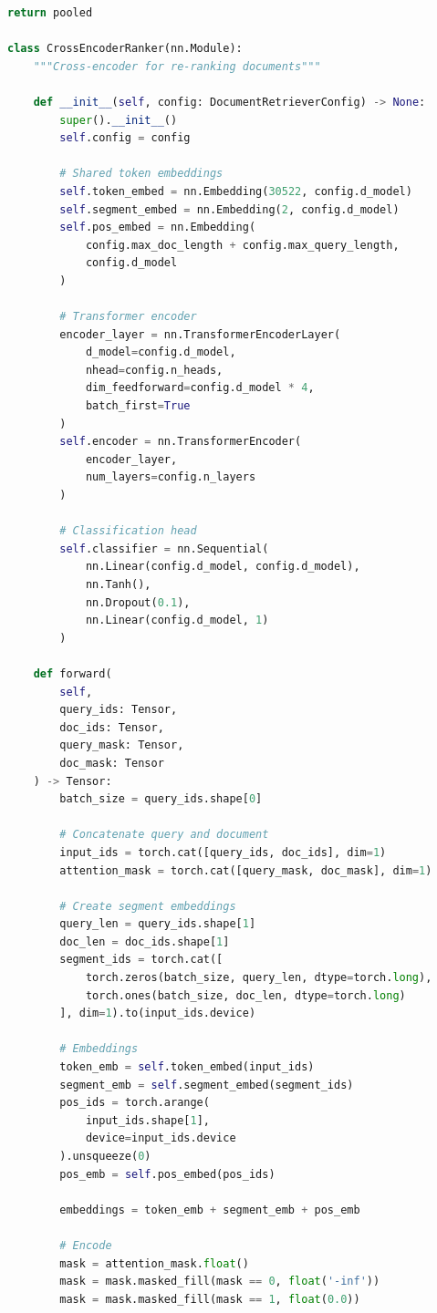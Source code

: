 \begin{lstlisting}[language=Python, caption=Document Retrieval System]
        return pooled

class CrossEncoderRanker(nn.Module):
    """Cross-encoder for re-ranking documents"""

    def __init__(self, config: DocumentRetrieverConfig) -> None:
        super().__init__()
        self.config = config

        # Shared token embeddings
        self.token_embed = nn.Embedding(30522, config.d_model)
        self.segment_embed = nn.Embedding(2, config.d_model)
        self.pos_embed = nn.Embedding(
            config.max_doc_length + config.max_query_length,
            config.d_model
        )

        # Transformer encoder
        encoder_layer = nn.TransformerEncoderLayer(
            d_model=config.d_model,
            nhead=config.n_heads,
            dim_feedforward=config.d_model * 4,
            batch_first=True
        )
        self.encoder = nn.TransformerEncoder(
            encoder_layer,
            num_layers=config.n_layers
        )

        # Classification head
        self.classifier = nn.Sequential(
            nn.Linear(config.d_model, config.d_model),
            nn.Tanh(),
            nn.Dropout(0.1),
            nn.Linear(config.d_model, 1)
        )

    def forward(
        self,
        query_ids: Tensor,
        doc_ids: Tensor,
        query_mask: Tensor,
        doc_mask: Tensor
    ) -> Tensor:
        batch_size = query_ids.shape[0]

        # Concatenate query and document
        input_ids = torch.cat([query_ids, doc_ids], dim=1)
        attention_mask = torch.cat([query_mask, doc_mask], dim=1)

        # Create segment embeddings
        query_len = query_ids.shape[1]
        doc_len = doc_ids.shape[1]
        segment_ids = torch.cat([
            torch.zeros(batch_size, query_len, dtype=torch.long),
            torch.ones(batch_size, doc_len, dtype=torch.long)
        ], dim=1).to(input_ids.device)

        # Embeddings
        token_emb = self.token_embed(input_ids)
        segment_emb = self.segment_embed(segment_ids)
        pos_ids = torch.arange(
            input_ids.shape[1],
            device=input_ids.device
        ).unsqueeze(0)
        pos_emb = self.pos_embed(pos_ids)

        embeddings = token_emb + segment_emb + pos_emb

        # Encode
        mask = attention_mask.float()
        mask = mask.masked_fill(mask == 0, float('-inf'))
        mask = mask.masked_fill(mask == 1, float(0.0))


\end{lstlisting}
